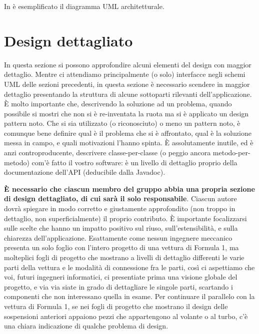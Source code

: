 \documentclass[a4paper,12pt]{report}
\begin{document}
	In  è esemplificato il diagramma UML architetturale.
	
	
	\section{Design dettagliato}
	
	In questa sezione si possono approfondire alcuni elementi del design con maggior dettaglio.
	Mentre ci attendiamo principalmente (o solo) interfacce negli schemi UML delle sezioni precedenti,
	in questa sezione è necessario scendere in maggior dettaglio presentando la struttura di alcune sottoparti rilevanti dell'applicazione.
	È molto importante che, descrivendo la soluzione ad un problema, quando possibile si mostri che non si è re-inventata la ruota ma si è applicato un design pattern noto.
	Che si sia utilizzato (o riconosciuto) o meno un pattern noto, è comunque bene definire qual è il problema che si è affrontato, qual è la soluzione messa in campo, e quali motivazioni l'hanno spinta.
	È assolutamente inutile, ed è anzi controproducente, descrivere classe-per-classe (o peggio ancora metodo-per-metodo) com'è fatto il vostro software: è un livello di dettaglio proprio della documentazione dell'API (deducibile dalla Javadoc).
	
	\textbf{È necessario che ciascun membro del gruppo abbia una propria sezione di design dettagliato,
		di cui sarà il solo responsabile}.
	Ciascun autore dovrà spiegare in modo corretto e giustamente approfondito (non troppo in dettaglio, non superficialmente) il proprio contributo.
	È importante focalizzarsi sulle scelte che hanno un impatto positivo sul riuso, sull'estensibilità, e sulla chiarezza dell'applicazione.
	Esattamente come nessun ingegnere meccanico presenta un solo foglio con l'intero progetto di una vettura di Formula 1, ma molteplici fogli di progetto che mostrano a livelli di dettaglio differenti le varie parti della vettura e le modalità di connessione fra le parti, così ci aspettiamo che voi, futuri ingegneri informatici, ci presentiate prima una visione globale del progetto, e via via siate in grado di dettagliare le singole parti, scartando i componenti che non interessano quella in esame.
	Per continuare il parallelo con la vettura di Formula 1, se nei fogli di progetto che mostrano il
	design delle sospensioni anteriori appaiono pezzi che appartengono al volante o al turbo, c'è una
	chiara indicazione di qualche problema di design.
	
\end{document}
